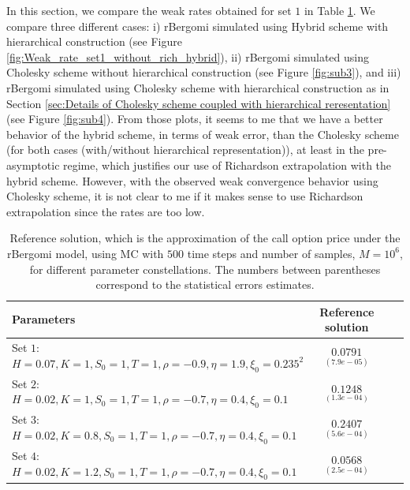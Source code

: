 \documentclass[11pt]{article}
\begin{document}
In this section, we compare the weak rates obtained for set $1$ in Table
\ref{table:Reference solution, using MC with $500$ time steps, of Call option price under rBergomi model, for different parameter constellation.}. We compare three different cases: i) rBergomi simulated using Hybrid scheme with hierarchical construction (see Figure \ref{fig:Weak_rate_set1_without_rich_hybrid}), ii) rBergomi simulated using Cholesky scheme without hierarchical construction (see Figure \ref{fig:sub3}), and iii) rBergomi simulated using Cholesky scheme with hierarchical construction as in Section \ref{sec:Details of Cholesky scheme coupled with hierarchical reresentation} (see Figure \ref{fig:sub4}). From those plots, it seems to me that we have a better behavior of the hybrid scheme, in terms of weak error, than the Cholesky scheme (for both cases (with/without hierarchical representation)), at least in the pre-asymptotic regime, which justifies our use of Richardson extrapolation with the hybrid scheme.  However, with the observed weak convergence behavior using Cholesky scheme, it is not clear to me if it makes sense to use Richardson extrapolation since the rates are too low.

\FloatBarrier
\begin{table}[!h]
	\centering
	\begin{small}
	\begin{tabular}{l*{2}{c}r}
	\toprule[1.5pt]
		Parameters            & Reference solution    \\
		\hline

			Set $1$:	$H=0.07, K=1,S_0=1, T=1, \rho=-0.9, \eta=1.9,\xi_0=0.235^2$   & $\underset{(7.9e-05)}{0.0791}$  \\	

				Set $2$:	$H=0.02, K=1, S_0=1, T=1,\rho=-0.7, \eta=0.4,\xi_0=0.1$   & $\underset{(1.3e-04)}{0.1248}$  \\
					Set $3$:	$H=0.02, K=0.8,S_0=1,T=1, \rho=-0.7, \eta=0.4,\xi_0=0.1$   & $\underset{(5.6e-04)}{0.2407}$  \\
						Set $4$:	$H=0.02, K=1.2,S_0=1,T=1, \rho=-0.7, \eta=0.4,\xi_0=0.1$   & $\underset{(2.5e-04)}{0.0568}$  \\
	\bottomrule[1.25pt]
	\end{tabular}
\end{small}
	\caption{Reference solution, which is the  approximation of the call option price under the rBergomi model,  using MC with $500$ time steps and number of samples, $M=10^6$, for different parameter constellations.  The numbers between parentheses correspond to the statistical errors estimates.}
	\label{table:Reference solution, using MC with $500$ time steps, of Call option price under rBergomi model, for different parameter constellation.}
\end{table}
\FloatBarrier
\end{document}
